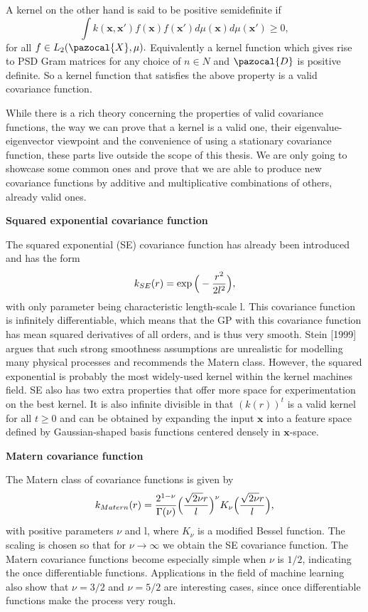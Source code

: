 \documentclass[12pt,a4paper,oneside]{book}
\theoremstyle{plain}
\theoremstyle{definition}
\begin{document}
{\vspace{3mm}
\noindent

A kernel on the other hand is said to be positive semidefinite if $$\int k(\bm{x},\bm{x}')f(\bm{x})f(\bm{x}')d\mu(\bm{x})d\mu(\bm{x}')\geq 0,$$ for all $f\in L_2(\pazocal{X},\mu).$ Equivalently a kernel function which gives rise to PSD Gram matrices for any choice of $n\in N$  and $\pazocal{D}$ is positive definite. So a kernel function that satisfies the above property is a valid covariance function.

\vspace{3mm}\noindent

While there is a rich theory concerning the properties of valid covariance functions, the way we can prove that a kernel is a valid one, their eigenvalue-eigenvector viewpoint and the convenience of using a stationary covariance function, these parts live outside the scope of this thesis. We are only going to showcase some common ones and prove that we are able to produce new covariance functions by additive and multiplicative combinations of others, already valid ones.
\vspace{3mm}
\begin{flushleft}
\textbf{Squared exponential covariance function}
\end{flushleft}
\noindent
The squared exponential (SE) covariance function has already been introduced and has the form $$k_{SE}(r)=\exp \Big{(}-\frac{r^2}{2l^2}\Big{)},$$ with only parameter being characteristic length-scale l. This covariance function is infinitely differentiable, which means that the GP with this covariance function has mean squared derivatives of all orders, and is thus very smooth. Stein [1999] argues that such strong smoothness assumptions are unrealistic for modelling many physical processes and recommends the Matern class. However, the squared exponential is probably the most widely-used kernel within the kernel machines field. SE also has two extra properties that offer more space for experimentation on the best kernel.   It is also infinite divisible in that $(k(r))^t$ is a valid kernel for all $t\geq 0$ and can  be obtained by expanding the input $\bm{x}$ into a feature space defined by Gaussian-shaped basis functions centered densely in $\bm{x}$-space. 
\vspace{3mm}
\begin{flushleft}
\textbf{Matern covariance function}
\end{flushleft}
\noindent
The Matern class of covariance functions is given by $$k_{Matern}(r)=\frac{2^{1-\nu}}{\Gamma(\nu)}\Big{(}\frac{\sqrt{2\nu}r}{l}\Big{)}^\nu K_{\nu}\Big{(}\frac{\sqrt{2\nu}r}{l}\Big{)},$$ with positive parameters $\nu$ and l, where $K_{\nu}$ is a modified Bessel function. The scaling is chosen so that for $\nu \rightarrow \infty$ we obtain the SE covariance function. The Matern covariance functions become especially simple when $\nu$ is $1/2$, indicating the once differentiable functions. Applications in the field of machine learning also show that $\nu=3/2$ and $\nu=5/2$ are interesting cases, since once differentiable functions make the process very rough. 
}
\end{document}
